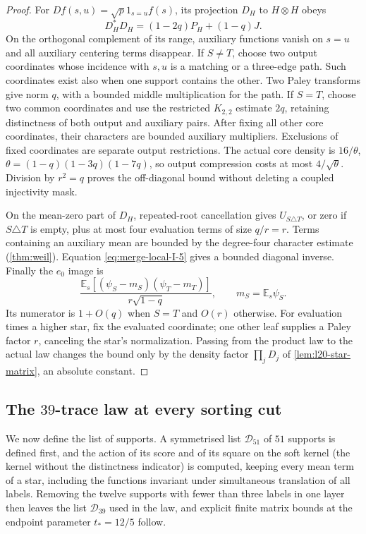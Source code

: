 \begin{proof}
For $Df(s,u)=\sqrt p1_{s=u}f(s)$, its projection $D_H$ to
$H\otimes H$ obeys
\begin{equation}\label{eq:merge-local-I-5}
 D_H^*D_H=(1-2q)P_H+(1-q)J.
\end{equation}
On the orthogonal complement of its range, auxiliary functions vanish
on $s=u$ and all auxiliary centering terms disappear.  If $S\ne T$,
choose two output coordinates whose incidence with $s,u$ is a
matching or a three-edge path.  Such coordinates exist also when one
support contains the other.  Two Paley transforms give norm $q$,
with a bounded middle multiplication for the path.  If $S=T$, choose
two common coordinates and use the restricted $K_{2,2}$ estimate
$2q$, retaining distinctness of both output and auxiliary pairs.
After fixing all other core coordinates, their characters are bounded
auxiliary multipliers.  Exclusions of fixed coordinates are separate
output restrictions.  The actual core density is
$16/\theta$, $\theta=(1-q)(1-3q)(1-7q)$, so output compression costs
at most $4/\sqrt\theta$.  Division by $r^2=q$ proves the off-diagonal
bound without deleting a coupled injectivity mask.

On the mean-zero part of $D_H$, repeated-root cancellation gives
$U_{S\triangle T}$, or zero if $S\triangle T$ is empty, plus at most
four evaluation terms of size $q/r=r$.  Terms containing an auxiliary
mean are bounded by the degree-four character estimate (\cref{thm:weil}).  Equation
\eqref{eq:merge-local-I-5} gives a bounded diagonal inverse.  Finally the $e_0$ image is
\[
 \frac{\mathbb E_s[(\psi_S-m_S)(\psi_T-m_T)]}
      {r\sqrt{1-q}},\qquad m_S=\mathbb E_s\psi_S.
\]
Its numerator is $1+O(q)$ when $S=T$ and $O(r)$ otherwise.
For evaluation times a higher star, fix the evaluated coordinate;
one other leaf supplies a Paley factor $r$, canceling the star's
normalization. Passing from the product law to the actual law
changes the bound only by the density factor $\prod_jD_j$ of
\cref{lem:l20-star-matrix}, an absolute constant.
\end{proof}

\subsection{The \texorpdfstring{$39$}{39}-trace law at every sorting cut}
\label{imp:local:filtered-coherent}

We now define the list of supports. A symmetrised list
$\mathcal D_{51}$ of $51$ supports is defined first, and the
action of its score and of its square on the soft kernel (the
kernel without the distinctness indicator) is computed, keeping
every mean term of a star, including the functions invariant under
simultaneous translation of all labels. Removing the twelve
supports with fewer than three labels in one layer then leaves
the list $\mathcal D_{39}$ used in the law, and explicit finite
matrix bounds at the endpoint parameter $t_*=12/5$ follow.

